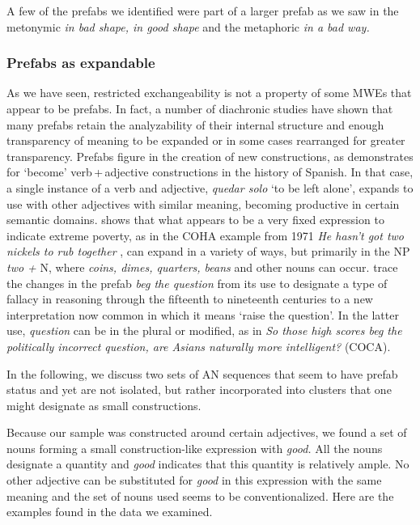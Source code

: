 \documentclass[output=paper]{langscibook}
\begin{document}
A few of the prefabs we identified were part of a larger prefab as we saw in the metonymic \textit{in bad shape, in good shape} and the metaphoric \textit{in a bad way.} 

\subsubsection{Prefabs as expandable}\label{sec:bybee:3.1.4}

As we have seen, restricted exchangeability is not a property of some MWEs that appear to be prefabs. In fact, a number of diachronic studies have shown that many prefabs retain the analyzability of their internal structure and enough transparency of meaning to be expanded or in some cases rearranged for greater transparency. Prefabs figure in the creation of new constructions, as \citet{Wilson2009} demonstrates for ‘become’ verb\,+\,adjective constructions in the history of Spanish. In that case, a single instance of a verb and adjective, \textit{quedar solo} ‘to be left alone’, expands to use with other adjectives with similar meaning, becoming productive in certain semantic domains. \citet{Bybee2014} shows that what appears to be a very fixed expression to indicate extreme poverty, as in the COHA example from 1971 \textit{He hasn't got two nickels to rub together} \citep{Davies2010}, can expand in a variety of ways, but primarily in the NP \textit{two +} N, where \textit{coins, dimes, quarters, beans} and other nouns can occur. \citet{BybeeModer2017} trace the changes in the prefab \textit{beg the question} from its use to designate a type of fallacy in reasoning through the fifteenth to nineteenth centuries to a new interpretation now common in which it means ‘raise the question’. In the latter use, \textit{question} can be in the plural or modified, as in \textit{So those high scores beg the politically incorrect question, are Asians naturally more intelligent?} (COCA). 

In the following, we discuss two sets of AN sequences that seem to have prefab status and yet are not isolated, but rather incorporated into clusters that one might designate as small constructions. 


Because our sample was constructed around certain adjectives, we found a set of nouns forming a small construction-like expression with \textit{good.} All the nouns designate a quantity and \textit{good} indicates that this quantity is relatively ample. No other adjective can be substituted for \textit{good} in this expression with the same meaning and the set of nouns used seems to be conventionalized. Here are the examples found in the data we examined.
\end{document}
